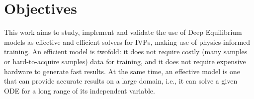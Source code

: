 



\section{Objectives}

This work aims to study, implement and validate the use of Deep Equilibrium models as effective and efficient solvers for \gls{IVP}s, making use of physics-informed training.
An efficient model is twofold: it does not require costly (many samples or hard-to-acquire samples) data for training, and it does not require expensive hardware to generate fast results.
At the same time, an effective model is one that can provide accurate results on a large domain, i.e., it can solve a given \gls{ODE} for a long range of its independent variable.

